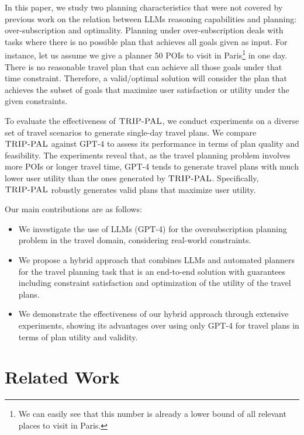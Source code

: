 \documentclass[letterpaper]{article}
\newcommand{\gpt}{{\sc GPT-4}\xspace}
\newcommand{\approach}{\ensuremath{\textsc{TRIP-PAL}}\xspace}
\begin{document}
In this paper, we study two planning characteristics that were not covered by previous work on the relation between LLMs reasoning capabilities and planning: over-subscription and optimality. Planning under over-subscription deals with tasks where there is no possible plan that achieves all goals given as input. For instance, let us assume we give a planner 50 POIs to visit in Paris\footnote{We can easily see that this number is already a lower bound of all relevant places to visit in Paris.} in one day. There is no reasonable travel plan that can achieve all those goals under that time constraint. Therefore, a valid/optimal solution will consider the plan that achieves the subset of goals that maximize user satisfaction or utility under the given constraints.

To evaluate the effectiveness of \approach, we conduct experiments on a diverse set of travel scenarios to generate single-day travel plans.
We compare  \approach against \gpt to assess its performance in terms of plan quality and feasibility. The experiments reveal that, as the travel planning problem involves more POIs or longer travel time, \gpt tends to generate travel plans with much lower user utility than the ones generated by \approach. Specifically, \approach robustly generates valid plans that maximize user utility.

Our main contributions are as follows:
\begin{itemize}
   
    \item We investigate the use of LLMs (\gpt) for the oversubscription planning problem in the travel domain, considering real-world constraints.
    
    \item We propose a hybrid approach that combines LLMs and automated planners for the travel planning task that is an end-to-end solution with guarantees including constraint satisfaction and optimization of the utility of the travel plans. 
    
    \item We demonstrate the effectiveness of our hybrid approach through extensive experiments, showing its advantages over using only \gpt for travel plans in terms of plan utility and validity.
\end{itemize}

\section{Related Work}
\end{document}
